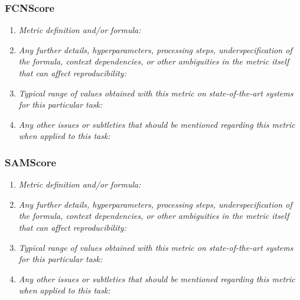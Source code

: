 \documentclass[a4paper,11pt]{article}
\begin{document}
        \subsubsection{FCNScore}
            \begin{enumerate}[label=\alph*.]
                \item \textit{Metric definition and/or formula:}
                \bigskip
                \item \textit{Any further details, hyperparameters, processing steps, underspecification of the formula, context dependencies, or other ambiguities in the metric itself that can affect reproducibility:}
                \bigskip
                \item \textit{Typical range of values obtained with this metric on state-of-the-art systems for this particular task:}
                \bigskip
                \item \textit{Any other issues or subtleties that should be mentioned regarding this metric when applied to this task:}
                \bigskip
            \end{enumerate}
        \subsubsection{SAMScore}
            \begin{enumerate}[label=\alph*.]
                \item \textit{Metric definition and/or formula:}
                \bigskip
                \item \textit{Any further details, hyperparameters, processing steps, underspecification of the formula, context dependencies, or other ambiguities in the metric itself that can affect reproducibility:}
                \bigskip
                \item \textit{Typical range of values obtained with this metric on state-of-the-art systems for this particular task:}
                \bigskip
                \item \textit{Any other issues or subtleties that should be mentioned regarding this metric when applied to this task:}
                \bigskip
            \end{enumerate}
\end{document}
